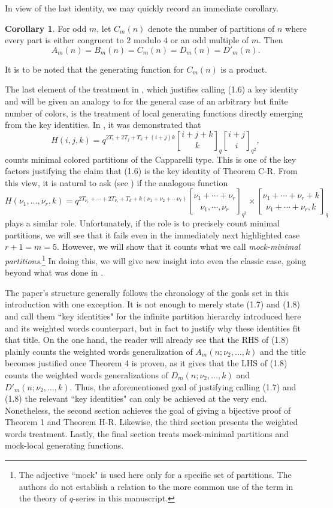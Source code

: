 \documentclass[12pt,a4paper]{amsart}
\theoremstyle{definition}
\theoremstyle{notation}
\theoremstyle{corollary}
\newtheorem{corollary}{Corollary}
\begin{document}
In view of the last identity, we may quickly record an immediate corollary.
\begin{corollary}
For odd $m$, let $C_m(n)$ denote the number of partitions of $n$ where every part is either congruent to $2$ modulo $4$ or an odd multiple of $m$. Then 
\[A_m(n)=B_m(n)=C_m(n)=D_m(n)=D'_m(n).\]
\end{corollary}
It is to be noted that the generating function for $C_m(n)$ is a product.

The last element of the treatment in \cite{KAGEABG95}, which justifies calling (1.6) a key identity and will be given an analogy to for the general case of an arbitrary but finite number of colors, is the treatment of local generating functions directly emerging from the key identities. In \cite{KAGEABG95}, it was demonstrated that \[H(i,j,k)=q^{2T_i+2T_j+T_k+(i+j)k}{{i+j+k} \brack k}_q{{i+j} \brack i}_{q^2},\]
counts minimal colored partitions of the Capparelli type. This is one of the key factors justifying the claim that (1.6) is the key identity of Theorem C-R.  From this view, it is natural to ask (see \cite[Rmk.~8.7]{YAKA25}) if the analogous function 
\[
H(\nu_1,\dots,\nu_r,k)=q^{2T_{\nu_1}+\cdots +2T_{\nu_r}+T_k+k(\nu_1+\nu_2+\cdots \nu_r)}{{\nu_1+\cdots+\nu_r}\brack {\nu_1, \cdots, \nu_r}}_{q^2}\times{{\nu_1+\cdots+\nu_r+k}\brack {\nu_1+\cdots+\nu_r,k}}_{q}\]
plays a similar role. Unfortunately, if the role is to precisely count minimal partitions, we will see that it fails even in the immediately next highlighted case $r+1=m=5$. However, we will show that it counts what we call \textit{mock-minimal partitions}.\footnote{The adjective ``mock" is used here only for a specific set of partitions. The authors do not establish a relation to the more common use of the term in the theory of $q$-series in this manuscript.} In doing this, we will give new insight into even the classic case, going beyond what was done in \cite{KAGEABG95}.


The paper’s structure generally follows the chronology of the goals set in this introduction with one exception. It is not enough to merely state (1.7) and (1.8) and call them ``key identities" for the infinite partition hierarchy introduced here and its weighted words counterpart, but in fact to justify why these identities fit that title. On the one hand, the reader will already see that the RHS of (1.8) plainly counts the weighted words generalization of $A_m(n;\nu_2,\dots,k)$ and the title becomes justified once Theorem 4 is proven, as it gives that the LHS of (1.8) counts the weighted words generalizations of $D_m(n;\nu_2,\dots,k)$ and $D'_m(n;\nu_2,\dots,k)$. Thus, the aforementioned goal of justifying calling (1.7) and (1.8) the relevant ``key identities" can only be achieved at the very end. Nonetheless, the second section achieves the goal of giving a bijective proof of Theorem 1 and Theorem H-R. Likewise, the third section presents the weighted words treatment. Lastly, the final section treats mock-minimal partitions and mock-local generating functions. 
\end{document}
